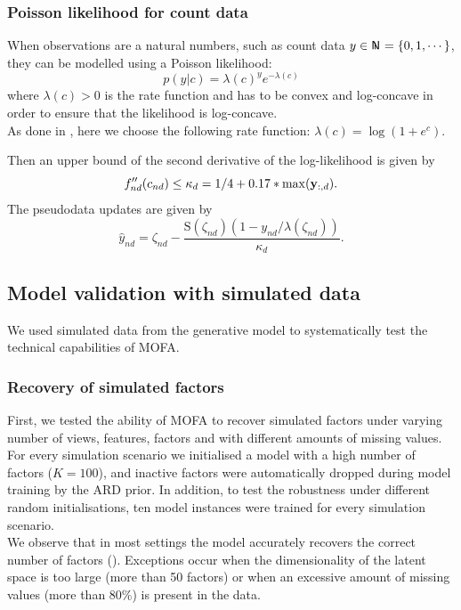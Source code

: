\subsubsection*{Poisson likelihood for count data}
When observations are a natural numbers, such as count data $y \in \N = \{0,1,\cdots\}$, they can be modelled using a Poisson likelihood:
\begin{equation*}
p(y|c) = \lambda(c)^y e^{-\lambda(c)}
\end{equation*}
where $\lambda(c)>0$ is the rate function and has to be convex and log-concave in order to ensure that the likelihood is log-concave.\\
As done in \cite{Seeger2012}, here we choose the following rate function: $\lambda(c)=\log(1+e^c)$.

Then an upper bound of the second derivative of the log-likelihood is given by
\begin{equation*}
f''_{nd}(c_{nd}) \leq \kappa_d = 1/4 + 0.17*\max({\bf y}_{:,d}).
\end{equation*}
The pseudodata updates are given by
\begin{equation*}
\hat{y}_{nd} = \zeta_{nd} - \frac{\mathrm{S}(\zeta_{nd})(1-y_{nd}/\lambda(\zeta_{nd}))}{\kappa_d}.
\end{equation*}


\newpage


\subsection{Model validation with simulated data} \label{section:mofa_simulated}
We used simulated data from the generative model to systematically test the technical capabilities of MOFA.

\subsubsection{Recovery of simulated factors}
First, we tested the ability of MOFA to recover simulated factors under varying number of views, features, factors and with different amounts of missing values.\\ 
For every simulation scenario we initialised a model with a high number of factors ($K=100$), and inactive factors were automatically dropped during model training by the ARD prior. In addition, to test the robustness under different random initialisations, ten model instances were trained for every simulation scenario.\\
We observe that in most settings the model accurately recovers the correct number of factors (). Exceptions occur when the dimensionality of the latent space is too large (more than 50 factors) or when an excessive amount of missing values (more than 80\%) is present in the data.

